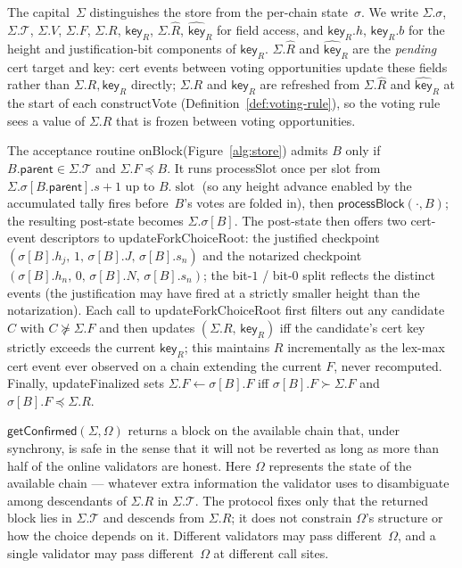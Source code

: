 \documentclass{article}
\newcommand{\T}[0]{\ensuremath{\mathcal{T}}}
\newcommand{\slot}[0]{\ensuremath{\operatorname{\mathrm{slot}}}}
\newcommand{\parent}{\mathsf{parent}}
\newcommand{\key}{\mathsf{key}}
\newcommand{\processSlot}{\textsf{processSlot}\xspace}
\newcommand{\processBlock}{\textsf{processBlock}\xspace}
\newcommand{\constructVote}{\textsf{constructVote}\xspace}
\newcommand{\onBlock}{\textsf{onBlock}\xspace}
\newcommand{\updateForkChoiceRoot}{\textsf{updateForkChoiceRoot}\xspace}
\newcommand{\updateFinalized}{\textsf{updateFinalized}\xspace}
\newcommand{\getConfirmed}{\textsf{getConfirmed}\xspace}
\theoremstyle{plain}
\theoremstyle{definition}
\theoremstyle{remark}
\begin{document}
The capital~$\Sigma$ distinguishes the store from the per-chain state~$\sigma$.
We write $\Sigma.\sigma$, $\Sigma.\T$, $\Sigma.V$, $\Sigma.F$, $\Sigma.R$, $\key_R$, $\Sigma.\hat{R}$, $\hat{\key}_R$ for field access, and $\key_R.h$, $\key_R.b$ for the height and justification-bit components of $\key_R$.
$\Sigma.\hat{R}$ and $\hat{\key}_R$ are the \emph{pending} cert target and key: cert events between voting opportunities update these fields rather than $\Sigma.R, \key_R$ directly; $\Sigma.R$ and $\key_R$ are refreshed from $\Sigma.\hat{R}$ and $\hat{\key}_R$ at the start of each \constructVote{} (Definition~\ref{def:voting-rule}), so the voting rule sees a value of $\Sigma.R$ that is frozen between voting opportunities.

The acceptance routine \onBlock (Figure~\ref{alg:store}) admits $B$ only if $B.\parent \in \Sigma.\T$ and $\Sigma.F \preceq B$.
It runs \processSlot once per slot from $\Sigma.\sigma[B.\parent].s + 1$ up to $B.\slot$ (so any height advance enabled by the accumulated tally fires before~$B$'s votes are folded in), then $\processBlock(\cdot, B)$; the resulting post-state becomes $\Sigma.\sigma[B]$.
The post-state then offers two cert-event descriptors to \updateForkChoiceRoot: the justified checkpoint $(\sigma[B].h_j,\, 1,\, \sigma[B].J,\, \sigma[B].s_n)$ and the notarized checkpoint $(\sigma[B].h_n,\, 0,\, \sigma[B].N,\, \sigma[B].s_n)$; the bit-$1$ / bit-$0$ split reflects the distinct events (the justification may have fired at a strictly smaller height than the notarization).
Each call to \updateForkChoiceRoot first filters out any candidate~$C$ with $C \not\succeq \Sigma.F$ and then updates $(\Sigma.R,\, \key_R)$ iff the candidate's cert key strictly exceeds the current $\key_R$; this maintains $R$ incrementally as the lex-max cert event ever observed on a chain extending the current $F$, never recomputed.
Finally, \updateFinalized sets $\Sigma.F \gets \sigma[B].F$ iff $\sigma[B].F \succ \Sigma.F$ and $\sigma[B].F \preceq \Sigma.R$.

$\getConfirmed(\Sigma, \Omega)$ returns a block on the available chain that, under synchrony, is safe in the sense that it will not be reverted as long as more than half of the online validators are honest. Here $\Omega$ represents the state of the available chain --- whatever extra information the validator uses to disambiguate among descendants of $\Sigma.R$ in $\Sigma.\T$. The protocol fixes only that the returned block lies in $\Sigma.\T$ and descends from $\Sigma.R$; it does not constrain $\Omega$'s structure or how the choice depends on it. Different validators may pass different~$\Omega$, and a single validator may pass different~$\Omega$ at different call sites.
\end{document}

